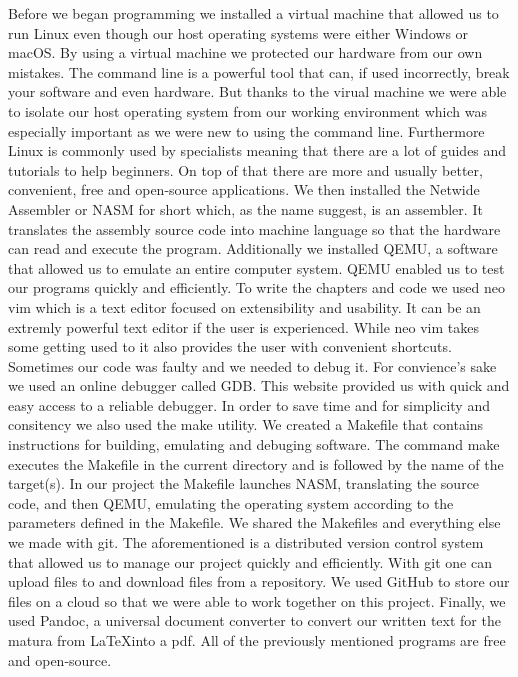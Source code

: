 Before we began programming we installed a virtual machine that 
allowed us to run Linux even though our host operating systems were either Windows or macOS. By using a virtual machine we protected our hardware from our own mistakes. The 
command line is a powerful tool that can, if used incorrectly, break your software and even hardware. But thanks to the virual machine we were able to isolate our host 
operating system from our working environment which was especially important as we were new to using the command line. Furthermore Linux is commonly used by specialists 
meaning that there are a lot of guides and tutorials to help beginners. On top of that there are more and usually better, convenient, free and open-source applications. We 
then installed the Netwide Assembler or NASM for short which, as the name suggest, is an assembler. It translates the assembly source code into machine language
so that the hardware can read and execute the program. Additionally we installed QEMU, a software that allowed us to emulate an entire computer system. QEMU enabled us to 
test our programs quickly and efficiently. To write the chapters and code we used neo vim which is a text editor focused on extensibility and usability. 
It can be an extremly powerful text editor if the user is experienced. While neo vim takes some getting used to it also provides the user with convenient shortcuts. 
Sometimes our code was faulty and we needed to debug it. For convience's sake we used an online debugger called GDB. This website provided us with quick and easy access to 
a reliable debugger. In order to save time and for simplicity and consitency we also used the make utility. We created a Makefile that contains instructions for building, 
emulating and debuging software. The command make executes the Makefile in the current directory and is followed by the name of the target(s). In our project the Makefile 
launches NASM, translating the source code, and then QEMU, emulating the operating system according to the parameters defined in the Makefile. We shared the Makefiles and 
everything else we made with git. The aforementioned is a distributed version control system that allowed us to manage our project quickly and efficiently. With git one can 
upload files to and download files from a repository. We used GitHub to store our files on a cloud so that we were able to work together on this project. Finally, we used Pandoc,
a universal document converter to convert our written text for the matura from \LaTeX into a pdf. All of the previously mentioned programs are free and open-source.

